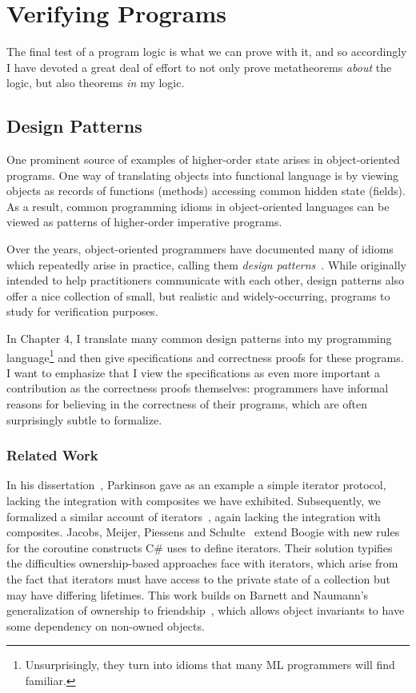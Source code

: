 \section{Verifying Programs}

The final test of a program logic is what we can prove with it, and so
accordingly I have devoted a great deal of effort to not only prove
metatheorems \emph{about} the logic, but also theorems \emph{in} my
logic.

\subsection{Design Patterns}

One prominent source of examples of higher-order state arises in
object-oriented programs. One way of translating objects into
functional language is by viewing objects as records of functions
(methods) accessing common hidden state (fields). As a result, common
programming idioms in object-oriented languages can be viewed as
patterns of higher-order imperative programs.

Over the years, object-oriented programmers have documented many of
idioms which repeatedly arise in practice, calling them \emph{design
  patterns}~\cite{gof}. While originally intended to help practitioners
communicate with each other, design patterns also offer a nice collection 
of small, but realistic and widely-occurring, programs to study for
verification purposes. 

In Chapter 4, I translate many common design patterns into my
programming language\footnote{Unsurprisingly, they turn into idioms
  that many ML programmers will find familiar.} and then give
specifications and correctness proofs for these programs. I want to
emphasize that I view the specifications as even more important a
contribution as the correctness proofs themselves: programmers have
informal reasons for believing in the correctness of their programs,
which are often surprisingly subtle to formalize. 


\subsubsection{Related Work}

In his dissertation~\cite{parkinson-thesis}, Parkinson gave as an
example a simple iterator protocol, lacking the integration with
composites we have exhibited.  Subsequently, we formalized a similar
account of iterators~\cite{iterator}, again lacking the integration
with composites. Jacobs, Meijer, Piessens and
Schulte~\cite{iterators-revisited} extend Boogie with new rules for
the coroutine constructs C\# uses to define iterators. Their solution
typifies the difficulties ownership-based approaches face with
iterators, which arise from the fact that iterators must have access
to the private state of a collection but may have differing
lifetimes. This work builds on Barnett and Naumann's generalization of
ownership to friendship~\cite{friends}, which allows object invariants
to have some dependency on non-owned objects.

